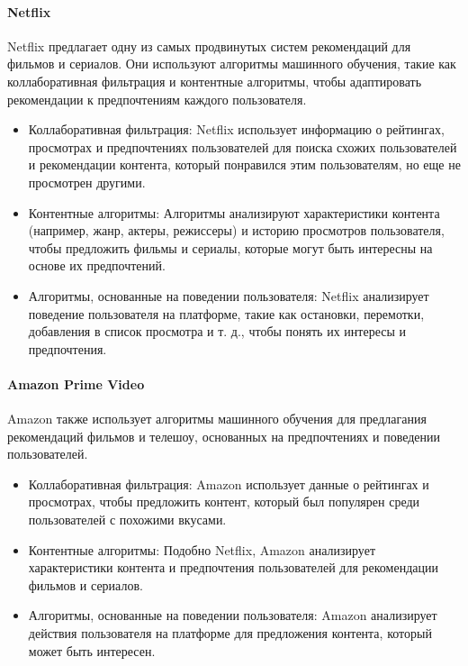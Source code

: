 \paragraph{Netflix}\par
Netflix предлагает одну из самых продвинутых систем рекомендаций для фильмов и сериалов.
Они используют алгоритмы машинного обучения, такие как коллаборативная фильтрация и контентные алгоритмы, чтобы
адаптировать рекомендации к предпочтениям каждого пользователя.
\begin{itemize}
    \item Коллаборативная фильтрация:
    Netflix использует информацию о рейтингах, просмотрах и предпочтениях пользователей для поиска схожих пользователей
    и рекомендации контента, который понравился этим пользователям, но еще не просмотрен другими.
    \item Контентные алгоритмы:
    Алгоритмы анализируют характеристики контента (например, жанр, актеры, режиссеры) и историю просмотров пользователя,
    чтобы предложить фильмы и сериалы, которые могут быть интересны на основе их предпочтений.
    \item Алгоритмы, основанные на поведении пользователя:
    Netflix анализирует поведение пользователя на платформе, такие как остановки, перемотки, добавления в список
    просмотра и т. д., чтобы понять их интересы и предпочтения.
\end{itemize}

\paragraph{Amazon Prime Video}

Amazon также использует алгоритмы машинного обучения для предлагания рекомендаций фильмов и телешоу,
основанных на предпочтениях и поведении пользователей.

\begin{itemize}
    \item Коллаборативная фильтрация:
    Amazon использует данные о рейтингах и просмотрах, чтобы предложить контент, который был популярен среди
    пользователей с похожими вкусами.
    \item Контентные алгоритмы:
    Подобно Netflix, Amazon анализирует характеристики контента и предпочтения пользователей для рекомендации фильмов
    и сериалов.
    \item Алгоритмы, основанные на поведении пользователя:
    Amazon анализирует действия пользователя на платформе для предложения контента, который может быть интересен.
\end{itemize}

